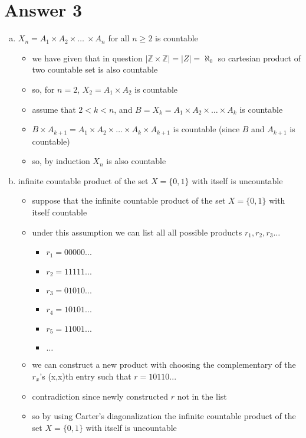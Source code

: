 \documentclass[12pt]{article}
\begin{document}
\section*{Answer 3}
\begin{enumerate}[a)]
    \item $X_{n} = A_{1} \times A_{2} \times \dots \ \times A_{n}$ for all $n \geq 2 $ is countable
    \begin{itemize}
        \item we have given that in question  $|\mathbb{Z} \times \mathbb{Z}| = |Z| = \aleph_{0}$ so cartesian product of two countable set is also countable
        \item so, for $n=2$, $X_{2} = A_{1} \times A_{2}$ is countable
        \item assume that $2<k<n$, and $B = X_{k} = A_{1} \times A_{2} \times \dots \times A_{k}$ is countable
        \item $B \times A_{k+1} = A_{1} \times A_{2} \times \dots \times A_{k} \times A_{k+1}$ is countable (since $B$  and $A_{k+1}$ is countable)
        \item so, by induction $X_{n}$ is also countable
    \end{itemize}
    \item infinite countable product of the set $X = \{0,1\}$ with itself is uncountable
    \begin{itemize}
        \item suppose that the infinite countable product of the set  $X = \{0,1\}$ with itself countable
        \item under this assumption we can list all all possible products $r_{1}, r_{2}, r_{3}\dots$
        \begin{itemize}
            \item $r_{1} = 00000...$
            \item $r_{2} = 11111...$
            \item $r_{3} = 01010...$
            \item $r_{4} = 10101...$
            \item $r_{5} = 11001...$
            \item $\dots$
        \end{itemize}
        \item we can construct a new product with choosing the complementary of the $r_{x}$'s (x,x)th entry such that $r = 10110...$
        \item contradiction since newly constructed $r$ not in the list
        \item so by using Carter's diagonalization the infinite countable product of the set  $X = \{0,1\}$ with itself is uncountable 
    \end{itemize}
\end{enumerate}
\end{document}
